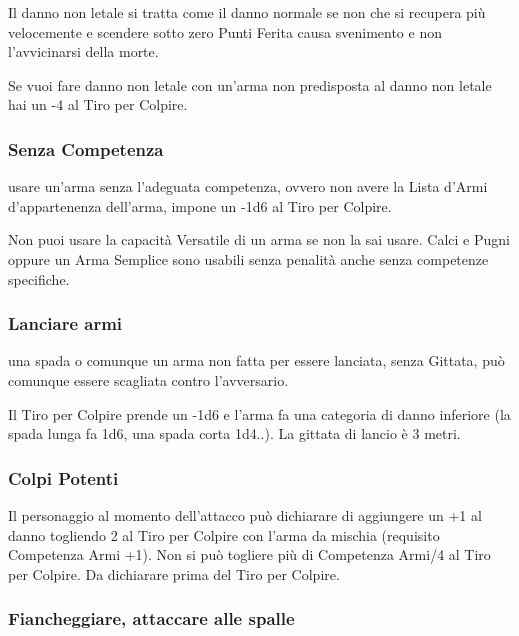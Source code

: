 \begin{multicols}{2}
Il danno non letale si tratta come il danno normale se non che si recupera più velocemente e scendere sotto zero Punti Ferita causa svenimento e non l'avvicinarsi della morte.

 \label{dannononletalearmanonidonea}

Se vuoi fare danno non letale con un'arma non predisposta al danno non letale hai un -4 al Tiro per Colpire.

\subsubsection{Senza Competenza}\label{senzacompetenza}

usare un'arma senza l'adeguata competenza, ovvero non avere la Lista d'Armi d'appartenenza dell'arma, impone un -1d6 al Tiro per Colpire.

Non puoi usare la capacità Versatile di un arma se non la sai usare. Calci e Pugni oppure un Arma Semplice sono usabili senza penalità anche senza competenze specifiche.

\subsubsection{Lanciare armi} \label{lanciarearmi}

una spada o comunque un arma non fatta per essere lanciata, senza Gittata, può comunque essere scagliata contro l'avversario.

Il Tiro per Colpire prende un -1d6 e l'arma fa una categoria di danno inferiore (la spada lunga fa 1d6, una spada corta 1d4..). La gittata di lancio è 3 metri.

\subsubsection{Colpi Potenti}\label{colpipotenti}

Il personaggio al momento dell'attacco può dichiarare di aggiungere un +1 al danno togliendo 2 al Tiro per Colpire con l'arma da mischia (requisito Competenza Armi +1). Non si può togliere più di Competenza Armi/4 al Tiro per Colpire. Da dichiarare prima del Tiro per Colpire.

\subsubsection{Fiancheggiare, attaccare alle spalle}\hypertarget{fiancheggiare}{} \label{fiancheggiare}


\end{multicols}
